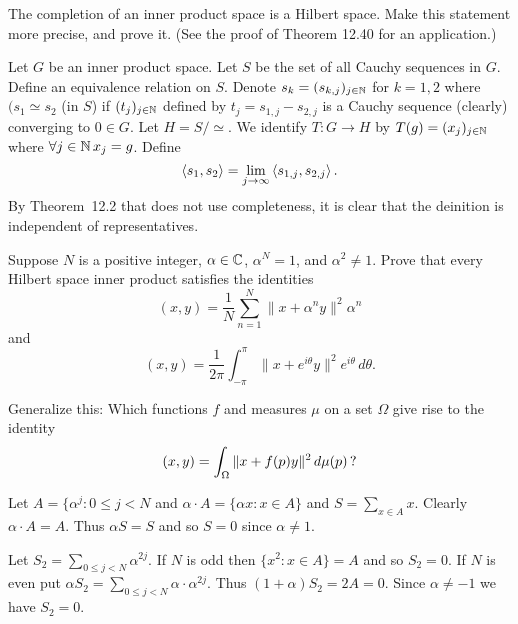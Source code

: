 \begin{enumerate}

\begin{excopy}
The completion of an inner product space is a Hilbert space.
Make this statement more precise, and prove it.
(See the proof of Theorem 12.40 for an application.)
\end{excopy}

Let $G$ be an inner product space.
Let $S$ be the set of all Cauchy sequences in $G$.
Define an equivalence relation on $S$.
Denote \(s_k = (s_{k,j})_{j\in\mathbb{N}}\) for \(k=1,2\)
where  \((s_1 \simeq s_2\) (in $S$)
if \((t_j)_{j\in\mathbb{N}}\) defined by \(t_j = s_{1,j}-s_{2,j}\)
is a Cauchy sequence (clearly) converging to \(0\in G\).
Let \(H = S/\simeq\). We identify \(T: G\to H\) by
\(T(g)=(x_j)_{j\in\mathbb{N}}\)  where \(\forall j\in\mathbb{N}\, x_j=g\).
Define 
\begin{equation*}
\left\langle s_1,s_2 \right\rangle = \lim_{j\to\infty} \left\langle s_{1,j},s_{2,j} \right\rangle.
\end{equation*}
By Theorem~12.2 that does not use completeness, it is clear
that the deinition is independent of representatives.

\begin{excopy}
Suppose $N$ is a positive integer,
\(\alpha \in \mathbb{C}\), \(\alpha^N = 1\), and \(\alpha^2 \neq 1\).
Prove that every
Hilbert space inner product satisfies the identities
\begin{equation*}
 (x, y) = \frac{1}{N}\sum_{n=1}^N \|x + \alpha^n y\|^2 \alpha^n
\end{equation*}
and
\begin{equation*}
 (x, y) = \frac{1}{2\pi}\int_{-\pi}^\pi \|x + e^{i\theta} y\|^2 e^{i\theta}\,d\theta.
\end{equation*}

Generalize this: Which functions $f$ and
measures \(\mu\) on a set \(\Omega\) give rise to the
identity
\begin{equation*}
 (x, y) = \int_\Omega \|x + f(p)y\|^2 \,d\mu(p) \,\textnormal{?}
\end{equation*}

\end{excopy}

Let \(A = \{\alpha^j: 0\leq j < N\) and
\(\alpha\cdot A = \{\alpha x: x\in A\}\) and \(S=\sum_{x\in A} x\).
Clearly \(\alpha \cdot A = A\).
Thus \(\alpha S = S\) and so \(S=0\) since \(\alpha \neq 1\).

Let \(S_2 = \sum_{0\leq j<N} \alpha^{2j}\).
If $N$ is odd then \(\{x^2: x\in A\} = A\) and so \(S_2 = 0\).
If $N$ is even put \(\alpha S_2 = \sum_{0\leq j<N} \alpha\cdot\alpha^{2j}\).
Thus \((1+\alpha)S_2 = 2A = 0\). Since \(\alpha \neq -1\) we have \(S_2=0\).


\end{enumerate}
